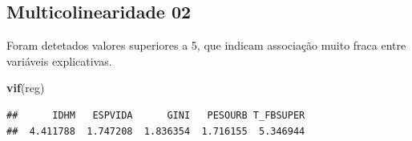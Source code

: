 \documentclass[]{article}
\newenvironment{Shaded}{\begin{snugshade}}{\end{snugshade}}
\newcommand{\KeywordTok}[1]{\textcolor[rgb]{0.13,0.29,0.53}{\textbf{#1}}}
\newcommand{\NormalTok}[1]{#1}
\begin{document}
\subsection{Multicolinearidade 02}\label{multicolinearidade-02}

Foram detetados valores superiores a 5, que indicam associação muito
fraca entre variáveis explicativas.

\begin{Shaded}
\begin{Highlighting}[]
\KeywordTok{vif}\NormalTok{(reg)}
\end{Highlighting}
\end{Shaded}

\begin{verbatim}
##      IDHM   ESPVIDA      GINI   PESOURB T_FBSUPER 
##  4.411788  1.747208  1.836354  1.716155  5.346944
\end{verbatim}
\end{document}
